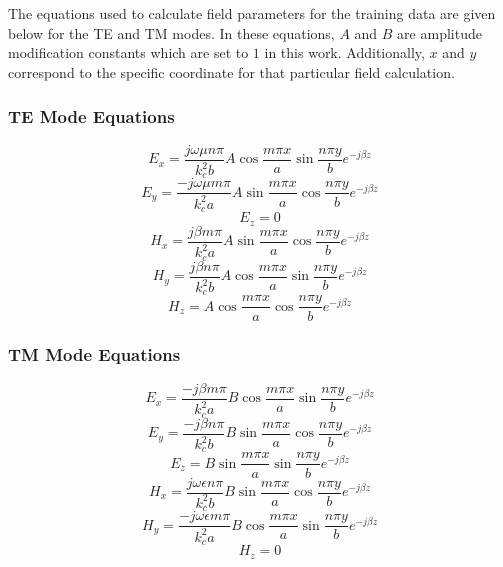 \documentclass[conference]{IEEEtran}
\begin{document}
The equations\cite[Table 3.2]{pozar_microwave_2012} used to calculate field parameters for the training data are given below for the TE and TM modes. In these equations, $A$ and $B$ are amplitude modification constants which are set to $1$ in this work. Additionally, $x$ and $y$ correspond to the specific coordinate for that particular field calculation.

\subsubsection{TE Mode Equations}
\begin{equation}
	E_x = \frac{j \omega \mu n \pi}{k_{c}^2 b} A \cos{\frac{m \pi x}{a}}\sin{\frac{n \pi y}{b}}e^{-j \beta z}
\end{equation}
\begin{equation}
	E_y = \frac{-j \omega \mu m \pi}{k_{c}^2 a} A \sin{\frac{m \pi x}{a}}\cos{\frac{n \pi y}{b}}e^{-j \beta z}
\end{equation}
\begin{equation}
	E_z = 0
\end{equation}
\begin{equation}
	H_x = \frac{j \beta m \pi}{k_{c}^2 a} A \sin{\frac{m \pi x}{a}}\cos{\frac{n \pi y}{b}}e^{-j \beta z}
\end{equation}
\begin{equation}
	H_y = \frac{j \beta n \pi}{k_{c}^2 b} A \cos{\frac{m \pi x}{a}}\sin{\frac{n \pi y}{b}}e^{-j \beta z}
\end{equation}
\begin{equation}
	H_z = A \cos{\frac{m \pi x}{a}}\cos{\frac{n \pi y}{b}}e^{-j \beta z}
\end{equation}

\subsubsection{TM Mode Equations}
\begin{equation}
	E_x = \frac{-j \beta m \pi}{k_{c}^2 a} B \cos{\frac{m \pi x}{a}}\sin{\frac{n \pi y}{b}}e^{-j \beta z}
\end{equation}
\begin{equation}
	E_y = \frac{-j \beta n \pi}{k_{c}^2 b} B \sin{\frac{m \pi x}{a}}\cos{\frac{n \pi y}{b}}e^{-j \beta z}
\end{equation}
\begin{equation}
	E_z = B \sin{\frac{m \pi x}{a}}\sin{\frac{n \pi y}{b}}e^{-j \beta z}
\end{equation}
\begin{equation}
	H_x = \frac{j \omega \epsilon n \pi}{k_{c}^2 b} B \sin{\frac{m \pi x}{a}}\cos{\frac{n \pi y}{b}}e^{-j \beta z}
\end{equation}
\begin{equation}
	H_y = \frac{-j \omega \epsilon m \pi}{k_{c}^2 a} B \cos{\frac{m \pi x}{a}}\sin{\frac{n \pi y}{b}}e^{-j \beta z}
\end{equation}
\begin{equation}
	H_z = 0
\end{equation}
\end{document}
